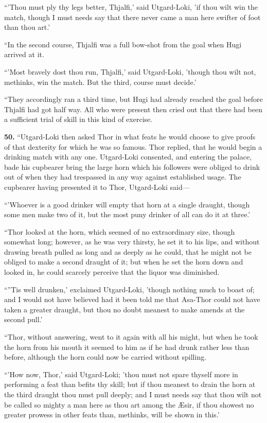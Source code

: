 ``'Thou must ply thy legs better, Thjalfi,' said Utgard-Loki, 'if thou
wilt win the match, though I must needs say that there never came a
man here swifter of foot than thou art.'

``In the second course, Thjalfi was a full bow-shot from the goal when
Hugi arrived at it.

``'Most bravely dost thou run, Thjalfi,' said Utgard-Loki, 'though thou
wilt not, methinks, win the match. But the third, course must decide.'

``They accordingly ran a third time, but Hugi had already reached the
goal before Thjalfi had got half way. All who were present then cried
out that there had been a sufficient trial of skill in this kind of
exercise.

\textbf{50.} ``Utgard-Loki then asked Thor in what feats he would choose to
give proofs of that dexterity for which he was so famous. Thor
replied, that he would begin a drinking match with any one.
Utgard-Loki consented, and entering the palace, bade his cupbearer
bring the large horn which his followers were obliged to drink out of
when they had trespassed in any way against established usage. The
cupbearer having presented it to Thor, Utgard-Loki said—

``'Whoever is a good drinker will empty that horn at a single draught,
though some men make two of it, but the most puny drinker of all can
do it at three.'

``Thor looked at the horn, which seemed of no extraordinary size,
though somewhat long; however, as he was very thirsty, he set it to
his lips, and without drawing breath pulled as long and as deeply as
he could, that he might not be obliged to make a second draught of it;
but when he set the horn down and looked in, he could scarcely
perceive that the liquor was diminished.

``''Tis well drunken,' exclaimed Utgard-Loki, 'though nothing much to
boast of; and I would not have believed had it been told me that
Asa-Thor could not have taken a greater draught, but thou no doubt
meanest to make amends at the second pull.'

``Thor, without answering, went to it again with all his might, but
when he took the horn from his mouth it seemed to him as if he had
drunk rather less than before, although the horn could now be carried
without spilling.

``'How now, Thor,' said Utgard-Loki; 'thou must not spare thyself more
in performing a feat than befits thy skill; but if thou meanest to
drain the horn at the third draught thou must pull deeply; and I must
needs say that thou wilt not be called so mighty a man here as thou
art among the Æsir, if thou showest no greater prowess in other feats
than, methinks, will be shown in this.'

